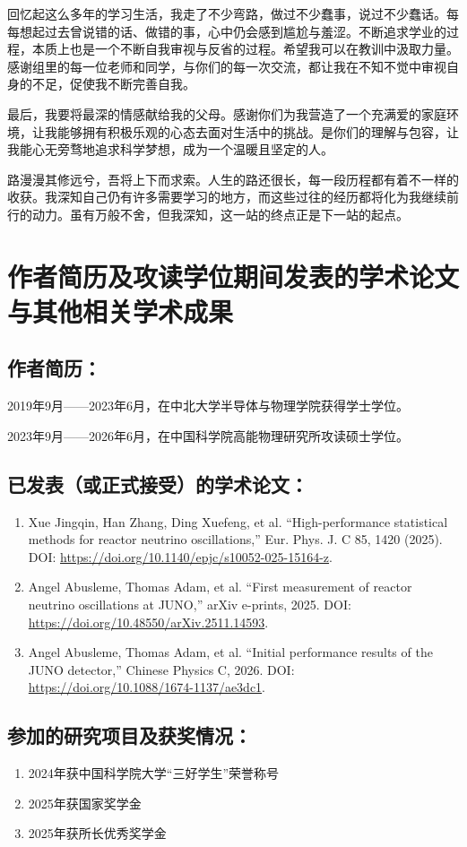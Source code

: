 回忆起这么多年的学习生活，我走了不少弯路，做过不少蠢事，说过不少蠢话。每每想起过去曾说错的话、做错的事，心中仍会感到尴尬与羞涩。不断追求学业的过程，本质上也是一个不断自我审视与反省的过程。希望我可以在教训中汲取力量。感谢组里的每一位老师和同学，与你们的每一次交流，都让我在不知不觉中审视自身的不足，促使我不断完善自我。

最后，我要将最深的情感献给我的父母。感谢你们为我营造了一个充满爱的家庭环境，让我能够拥有积极乐观的心态去面对生活中的挑战。是你们的理解与包容，让我能心无旁骛地追求科学梦想，成为一个温暖且坚定的人。

路漫漫其修远兮，吾将上下而求索。人生的路还很长，每一段历程都有着不一样的收获。我深知自己仍有许多需要学习的地方，而这些过往的经历都将化为我继续前行的动力。虽有万般不舍，但我深知，这一站的终点正是下一站的起点。


\chapter{作者简历及攻读学位期间发表的学术论文与其他相关学术成果}

\section*{作者简历：}
2019年9月——2023年6月，在中北大学半导体与物理学院获得学士学位。

2023年9月——2026年6月，在中国科学院高能物理研究所攻读硕士学位。

\section*{已发表（或正式接受）的学术论文：}

{
\setlist[enumerate]{}%
\begin{enumerate}[nosep]
    \item Xue Jingqin, Han Zhang, Ding Xuefeng, et al. ``High-performance statistical methods for reactor neutrino oscillations,'' Eur. Phys. J. C 85, 1420 (2025). DOI: \url{https://doi.org/10.1140/epjc/s10052-025-15164-z}.
    \item Angel Abusleme, Thomas Adam, et al. ``First measurement of reactor neutrino oscillations at JUNO,'' arXiv e-prints, 2025. DOI: \url{https://doi.org/10.48550/arXiv.2511.14593}.
    \item Angel Abusleme, Thomas Adam, et al. ``Initial performance results of the JUNO detector,'' Chinese Physics C, 2026. DOI: \url{https://doi.org/10.1088/1674-1137/ae3dc1}.
\end{enumerate}
}



\section*{参加的研究项目及获奖情况：}

\begin{enumerate}[nosep]
    \item 2024年获中国科学院大学“三好学生”荣誉称号
    \item 2025年获国家奖学金
    \item 2025年获所长优秀奖学金
\end{enumerate}

\cleardoublepage[plain]%
